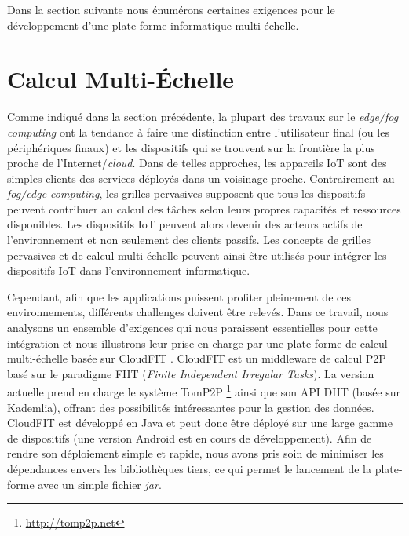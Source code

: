 Dans la section suivante nous énumérons certaines exigences pour le développement d'une plate-forme informatique multi-échelle.

\section{Calcul Multi-Échelle}\label{sec:requeriments}

Comme indiqué dans la section précédente, la plupart des travaux sur le \textit{edge/fog computing} ont la tendance à faire une distinction entre l'utilisateur final (ou les périphériques finaux) et les dispositifs qui se trouvent sur la frontière la plus proche de l'Internet/\textit{cloud}. Dans de telles approches, les appareils IoT sont des simples clients des services déployés dans un voisinage proche. Contrairement au \textit{fog/edge computing}, les grilles pervasives supposent que tous les dispositifs peuvent contribuer au calcul des tâches selon leurs propres capacités et ressources disponibles. Les dispositifs IoT peuvent alors devenir des acteurs actifs de l'environnement et non seulement des clients passifs. Les concepts de grilles pervasives et de calcul multi-échelle peuvent ainsi être utilisés pour intégrer les dispositifs IoT dans l'environnement informatique.

Cependant, afin que les applications puissent profiter pleinement de ces environnements, différents challenges doivent être relevés. 
Dans ce travail, nous analysons un ensemble d'exigences qui nous paraissent essentielles pour cette intégration et nous illustrons leur prise en charge par une %
plate-forme de calcul multi-échelle basée sur CloudFIT \cite{Steffenel2015Roma}. CloudFIT est un middleware de calcul P2P basé sur le paradigme FIIT (\textit{Finite Independent Irregular Tasks}). La version actuelle prend en charge le système %
TomP2P \footnote{\url{http://tomp2p.net}} ainsi que son API DHT (basée sur Kademlia), offrant des possibilités intéressantes pour la gestion des données. CloudFIT est développé en Java et peut donc être déployé sur une large gamme de dispositifs (une version Android est en cours de développement). Afin de rendre son déploiement simple et rapide, nous avons pris soin de minimiser les dépendances envers les bibliothèques tiers, ce qui permet le lancement de la plate-forme avec un simple fichier \textit{jar}.

